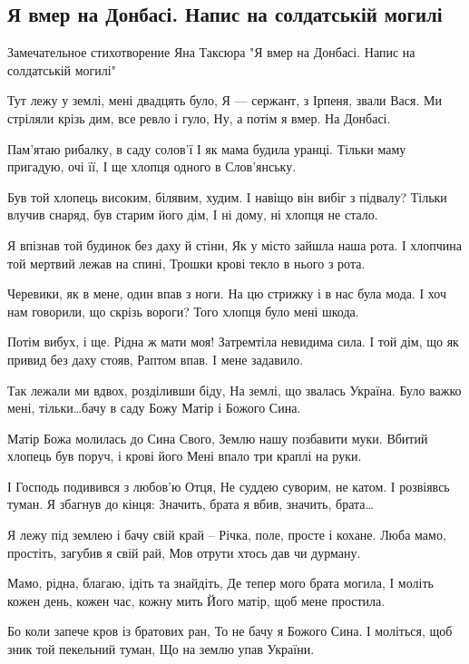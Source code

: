  
 

\subsection{Я вмер на Донбасі. Напис на солдатській могилі}
\label{sec:12_10_2020.poetry.jan_taksur.ja_vmer_na_donbasi}

\obeycr
Замечательное стихотворение Яна Таксюра
"Я вмер на Донбасі. Напис на солдатській могилі"

Тут лежу у землі, мені двадцять було,
Я --- сержант, з Ірпеня, звали Вася.
Ми стріляли крізь дим, все ревло і гуло,
Ну, а потім я вмер. На Донбасі.

Пам’ятаю рибалку, в саду солов’ї
І як мама будила уранці.
Тільки маму пригадую, очі її,
І ще хлопця одного в Слов’янську.

Був той хлопець високим, білявим, худим.
І навіщо він вибіг з підвалу?
Тільки влучив снаряд, був старим його дім,
І ні дому, ні хлопця не стало.

Я впізнав той будинок без даху й стіни,
Як у місто зайшла наша рота.
І хлопчина той мертвий лежав на спині,
Трошки крові текло в нього з рота.

Черевики, як в мене, один впав з ноги.
На цю стрижку і в нас була мода.
І хоч нам говорили, що скрізь вороги?
Того хлопця було мені шкода.

Потім вибух, і ще. Рідна ж мати моя!
Затремтіла невидима сила.
І той дім, що як привид без даху стояв,
Раптом впав. І мене задавило.

Так лежали ми вдвох, розділивши біду,
На землі, що звалась Україна.
Було важко мені, тільки…бачу в саду
Божу Матір і Божого Сина.

Матір Божа молилась до Сина Свого,
Землю нашу позбавити муки.
Вбитий хлопець був поруч, і крові його
Мені впало три краплі на руки.

І Господь подивився з любов’ю Отця,
Не суддею суворим, не катом.
І розвіявсь туман. Я збагнув до кінця:
Значить, брата я вбив, значить, брата…

Я лежу під землею і бачу свій край –
Річка, поле, просте і кохане.
Люба мамо, простіть, загубив я свій рай,
Мов отрути хтось дав чи дурману.

Мамо, рідна, благаю, ідіть та знайдіть,
Де тепер мого брата могила,
І моліть кожен день, кожен час, кожну мить
Його матір, щоб мене простила.

Бо коли запече кров із братових ран,
То не бачу я Божого Сина.
І моліться, щоб зник той пекельний туман,
Що на землю упав України.
\restorecr
